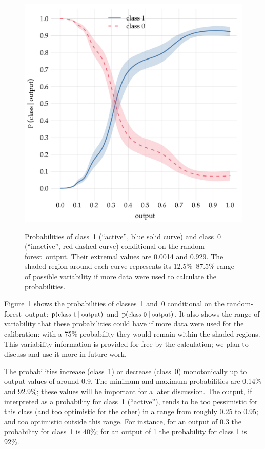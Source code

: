 \documentclass[\ifafour a4paper,12pt,\else a5paper,10pt,\fi%
onecolumn,oneside,article,%
british%
]{memoir}
\theoremstyle{remark}
\theoremstyle{innote}
\newcommand*{\p}{\mathrm{p}}%
\renewcommand*{\|}[1][]{\nonscript\:#1\vert\nonscript\:\mathopen{}}
\newcommand*{\texts}[1]{\text{\small #1}}
\newcommand*{\rf}{random-forest}
\begin{document}
\begin{figure}[t]
  \centering
  \includegraphics[width=\linewidth]{transducer_curve_RFraw2.pdf}\\
  \caption{Probabilities of class~1 (\enquote{active}, \textcolor{mypurpleblue}{blue solid curve}) and class~0 (\enquote{inactive}, \textcolor{myred}{red dashed curve}) conditional on the \rf\ output. Their extremal values are 0.0014 and 0.929. The shaded region around each curve represents its 12.5\%--87.5\% range of possible variability if more data were used to calculate the probabilities.}
  \label{fig:prob_curve_RF}
\end{figure}
%
Figure~\ref{fig:prob_curve_RF} shows the probabilities of classes~1 and~0 conditional on the \rf\ output: $\p(\texts{class 1} \| \texts{output})$ and $\p(\texts{class 0} \| \texts{output})$. It also shows the range of variability that these probabilities could have if more data were used for the calibration: with a 75\% probability they would remain within the shaded regions. This variability information is provided for free by the calculation; we plan to discuss and use it more in future work.

The probabilities increase (class~1) or decrease (class~0) monotonically up to output values of around 0.9. The minimum and maximum probabilities are 0.14\% and 92.9\%; these values will be important for a later discussion. The output, if interpreted as a probability for class~1 (\enquote{active}), tends to be too pessimistic for this class (and too optimistic for the other) in a range from roughly 0.25 to 0.95; and too optimistic outside this range. For instance, for an output of 0.3 the probability for class~1 is 40\%; for an output of 1 the probability for class 1 is 92\%.
\end{document}
